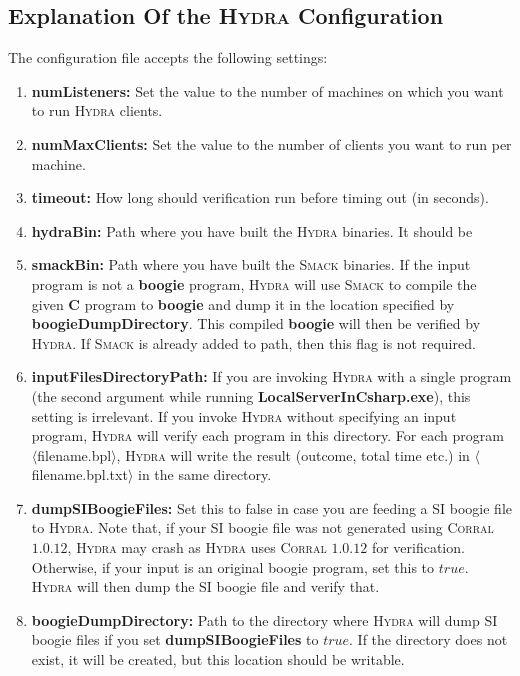 \documentclass{article}
\begin{document}
\subsection{Explanation Of the \textsc{Hydra} Configuration}
The configuration file accepts the following settings:
\begin{enumerate}
  \item \textbf{numListeners:} Set the value to the number of machines on which you want to run \textsc{Hydra} clients.
  \item \textbf{numMaxClients:} Set the value to the number of clients you want to run per machine.
  \item \textbf{timeout:} How long should verification run before timing out (in seconds).
  \item \textbf{hydraBin:} Path where you have built the \textsc{Hydra} binaries. It should be
  \par
  \noindent
  \item \textbf{smackBin:} Path where you have built the \textsc{Smack} binaries. If the input program is not a \textbf{boogie} program, \textsc{Hydra} will use \textsc{Smack} to compile the given \textbf{C} program to \textbf{boogie} and dump it in the location specified by \textbf{boogieDumpDirectory}. This compiled \textbf{boogie} will then be verified by \textsc{Hydra}. If \textsc{Smack} is already added to path, then this flag is not required.  
  \item \textbf{inputFilesDirectoryPath:} If you are invoking \textsc{Hydra} with a single program (the second argument while running \textbf{LocalServerInCsharp.exe}), this setting is irrelevant. If you invoke \textsc{Hydra} without specifying an input program, \textsc{Hydra} will verify each program in this directory. For each program  $\langle$filename.bpl$\rangle$, \textsc{Hydra} will write the result (outcome, total time etc.) in $\langle$filename.bpl.txt$\rangle$ in the same
      directory.
  \item \textbf{dumpSIBoogieFiles:} Set this to false in case you are feeding a SI boogie file to \textsc{Hydra}. Note that, if your SI boogie file was not generated using \textsc{Corral} $1.0.12$, \textsc{Hydra} may crash as \textsc{Hydra} uses \textsc{Corral} $1.0.12$ for verification. Otherwise, if your input is an original boogie program, set this to $true$. \textsc{Hydra} will then dump the SI boogie file and verify that.
  \item \textbf{boogieDumpDirectory:} Path to the directory where \textsc{Hydra} will dump SI boogie files if you set \textbf{dumpSIBoogieFiles} to $true$. If the directory does not exist, it will be created, but this location should be writable.

\end{enumerate}
\end{document}
